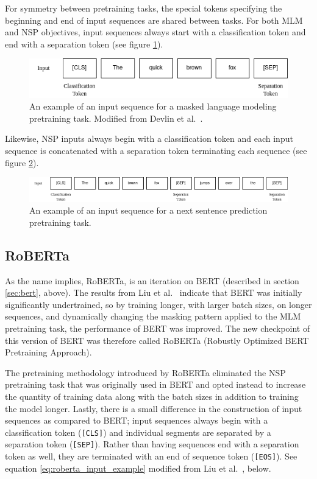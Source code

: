 \documentclass[12pt]{article}
\begin{document}
For symmetry between pretraining tasks, the special tokens specifying the beginning and end of input sequences are shared between tasks. For both MLM
and NSP objectives, input sequences always start with a classification token and end with a separation token (see figure \ref{fig:bert_mlm_input_example}).

\begin{figure}[h!]
    \includegraphics[width=\linewidth]{figures/BERT_MLM_input.png}
    \caption{An example of an input sequence for a masked language modeling pretraining task. Modified from Devlin et al.~\cite{devlin_bert_2019}.}
    \label{fig:bert_mlm_input_example}
\end{figure}

\noindent
Likewise, NSP inputs always begin with a classification token and each input sequence is concatenated with a separation token terminating each
sequence (see figure \ref{fig:bert_nsp_input_example}).

\begin{figure}[h!]
    \includegraphics[width=\linewidth]{figures/BERT_NSP_input.png}
    \caption{An example of an input sequence for a next sentence prediction pretraining task.}
    \label{fig:bert_nsp_input_example}
\end{figure}

\subsection{RoBERTa}\label{sec:roberta}
As the name implies, RoBERTa, is an iteration on BERT (described in section \ref{sec:bert}, above). The results from Liu et
al.~\cite{liu_roberta_2019} indicate that BERT was initially significantly undertrained, so by training longer, with larger batch sizes, on
longer sequences, and dynamically changing the masking pattern applied to the MLM pretraining task, the performance of BERT was improved. The new
checkpoint of this version of BERT was therefore called RoBERTa (Robustly Optimized BERT Pretraining Approach).

The pretraining methodology introduced by RoBERTa eliminated the NSP pretraining task that was originally used in BERT and opted instead to increase
the quantity of training data along with the batch sizes in addition to training the model longer. Lastly, there is a small difference in the
construction of input sequences as compared to BERT; input sequences always begin with a classification token (\lstinline|[CLS]|) and individual
segments are separated by a separation token (\lstinline|[SEP]|). Rather than having sequences end with a separation token as well, they are
terminated with an end of sequence token (\lstinline|[EOS]|). See equation \ref{eq:roberta_input_example} modified from Liu et
al.~\cite{liu_roberta_2019}, below.
\end{document}
